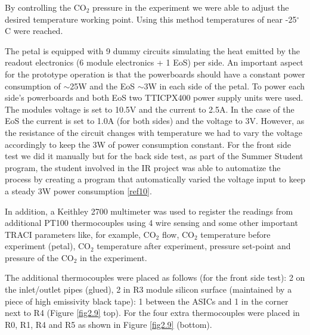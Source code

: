 		By controlling the CO$_{2}$ pressure in the experiment we were able to adjust the desired temperature working point. Using this method temperatures of near -25\space$^{\circ}$C were reached.
		
		The petal is equipped with 9 dummy circuits simulating the heat emitted by the readout electronics (6 module electronics + 1 EoS) per side. An important aspect for the prototype operation is that the powerboards should have a constant power consumption of $\sim$25W and the EoS $\sim$3W in each side of the petal. To power each side's powerboards and both EoS two TTICPX400 power supply units were used. The modules voltage is set to 10.5V and the current to 2.5A. In the case of the EoS the current is set to 1.0A (for both sides) and the voltage to 3V. However, as the resistance of the circuit changes with temperature we had to vary the voltage accordingly to keep the 3W of power consumption constant. For the front side test we did it manually but for the back side test, as part of the Summer Student program, the student involved in the IR project was able to automatize the process by creating a program that automatically varied the voltage input to keep a steady 3W power consumption \ref{ref10}.
		
		In addition, a Keithley 2700 multimeter was used to register the readings from additional PT100 thermocouples using 4 wire sensing and some other important TRACI parameters like, for example, CO$_{2}$ flow, CO$_{2}$ temperature before experiment (petal), CO$_{2}$ temperature after experiment, pressure set-point and pressure of the CO$_{2}$ in the experiment.
		
		The additional thermocouples were placed as follows (for the front side test): 2 on the inlet/outlet pipes (glued), 2 in R3 module silicon surface (maintained by a piece of high emissivity black tape): 1 between the ASICs and 1 in the corner next to R4 (Figure \ref{fig2.9} top). For the  four extra thermocouples were placed in R0, R1, R4 and R5 as shown in Figure \ref{fig2.9} (bottom).
		
